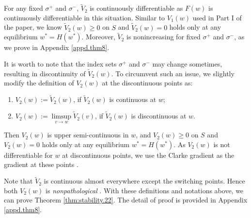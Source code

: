 For any fixed $\sigma^+$ and $\sigma^-$, $\tilde{V}_2$ is continuously differentiable as $F(w)$ is continuously differentiable in this situation. Similar to $V_1(w)$ used in Part I of the paper, we know $ \tilde{V}_2(w) \geq 0$ on $S$ and $ \tilde{V}_2(w)=0$ holds only at any equilibrium $w^* = H(w^*)$\cite{Fukushima:Equivalent}. Moreover, $\tilde{V}_2$ is nonincreasing for fixed $\sigma^+$ and $ \sigma^-$, as we prove in  Appendix \ref{appd.thm8}. 

It is worth to note that the index sets $\sigma^+$ and $\sigma^-$ may change sometimes, resulting in discontinuity of $\tilde{V}_2(w)$. To circumvent such an issue, we slightly modify the definition of $V_2(w)$ at the discontinuous points as:
\begin{enumerate}
	\item $V_2(w) := \tilde{V}_2(w)$, if $\tilde{V}_2(w)$ is continuous at $w$;
	\item $V_2(w) := \limsup\limits_{v\to w} \tilde{V}_2(v)$, if  $\tilde{V}_2(w)$ is discontinuous at $w$.
\end{enumerate}
Then $V_2(w)$ is upper semi-continuous in $w$, and  $ V_2(w) \geq 0$ on $S$ and $ V_2(w)=0$ holds only at any equilibrium $w^* = H(w^*)$. 
As  $V_2(w)$ is not differentiable for $w$ at discontinuous points, we use the Clarke gradient as the gradient at these points \cite{clarke:optimization}.

%

Note that $\tilde{V}_2$ is continuous almost everywhere except the switching points. Hence both $V_2(w)$ is \emph{nonpathological} \cite{Bacciotti:Nonpathological,bacciotti:stability}. With these definitions and notations above, we can prove  Theorem \ref{thm:stability.22}. The detail of proof is provided in  Appendix \ref{appd.thm8}.



       

